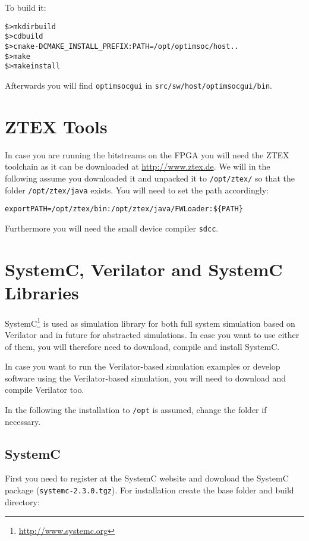 To build it:

\begin{alltt}
\$> mkdir build
\$> cd build
\$> cmake -DCMAKE_INSTALL_PREFIX:PATH=/opt/optimsoc/host ..
\$> make
\$> make install
\end{alltt}

Afterwards you will find \verb|optimsocgui| in
\verb|src/sw/host/optimsocgui/bin|.

\section{ZTEX Tools}

In case you are running the bitstreams on the FPGA you will need the
ZTEX toolchain as it can be downloaded at \url{http://www.ztex.de}. We
will in the following assume you downloaded it and unpacked it to
\verb|/opt/ztex/| so that the folder \verb|/opt/ztex/java| exists. You
will need to set the path accordingly:

\begin{alltt}
export PATH=/opt/ztex/bin:/opt/ztex/java/FWLoader:\$\{PATH\}
\end{alltt}

Furthermore you will need the small device compiler \verb|sdcc|.

\section{SystemC, Verilator and SystemC Libraries}

SystemC\footnote{\url{http://www.systemc.org}} is used as simulation
library for both full system simulation based on Verilator and in
future for abstracted simulations. In case you want to use either of
them, you will therefore need to download, compile and install
SystemC.

In case you want to run the Verilator-based simulation examples or
develop software using the Verilator-based simulation, you will need
to download and compile Verilator too.

In the following the installation to \verb|/opt| is assumed, change
the folder if necessary.

\subsection{SystemC}

First you need to register at the SystemC website and download the
SystemC package (\verb|systemc-2.3.0.tgz|). For installation create
the base folder and build directory:

